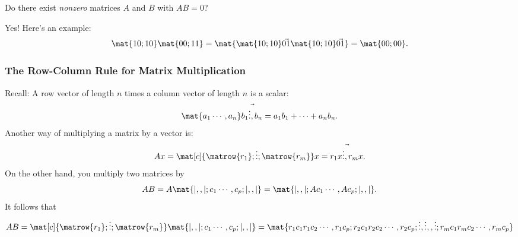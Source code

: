 
\begin{pollframe}

\vskip 5mm

\begin{bluebox}[Poll]{.8\textwidth}
  Do there exist \emph{nonzero} matrices $A$ and $B$ with $AB=0$?
\end{bluebox}

\pause\bigskip

Yes!  Here's an example:
\[ \mat{1 0; 1 0}\mat{0 0; 1 1} 
= \mat{\mat{1 0; 1 0}\vec{0 1} \mat{1 0;1 0}\vec{0 1}}
= \mat{0 0; 0 0}. \]


\end{pollframe}



\begin{frame}
\frametitle{The Row-Column Rule for Matrix Multiplication}

\alert{Recall:} A row vector of length $n$ times a column vector of length $n$
is a scalar:
\[ \mat{a_1 \cdots, a_n}\vec{b_1 \vdots, b_n} = a_1b_1 + \cdots + a_nb_n. \]
\pause
Another way of multiplying a matrix by a vector is:
\[ Ax = 
\mat[c]{ \matrow{r_1};
     \vdots ;
     \matrow{r_m}}
     x
= \vec{r_1x \vdots, r_mx}.
\]
\pause
On the other hand, you multiply two matrices by
\[ AB = A\mat{| ,, |; c_1 \cdots, c_p; | ,, |} =
\mat{| ,, |; Ac_1 \cdots, Ac_p; | ,, |}. \]
\pause
It follows that
\[ AB = 
\mat[c]{ \matrow{r_1};
     \vdots ;
     \matrow{r_m}} \mat{ | ,, |; c_1 \cdots, c_p; | ,, |}
= \mat{ r_1c_1 r_1c_2 \cdots, r_1c_p;
        r_2c_1 r_2c_2 \cdots, r_2c_p;
         \vdots, \vdots, , \vdots;
        r_mc_1 r_mc_2 \cdots, r_mc_p}
 \]

\end{frame}



